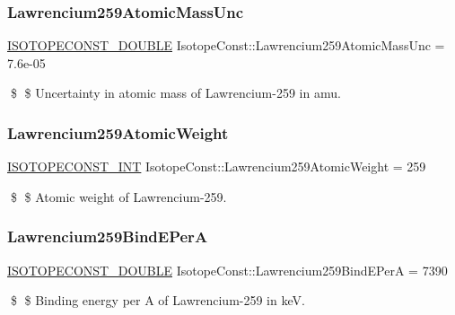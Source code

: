 \subsubsection{\texorpdfstring{Lawrencium259\+Atomic\+Mass\+Unc}{Lawrencium259AtomicMassUnc}}
{\footnotesize\ttfamily \mbox{\hyperlink{group___isotope_const-_macros_ga8f45a7272ce02c0b4c65c44636ed719a}{I\+S\+O\+T\+O\+P\+E\+C\+O\+N\+S\+T\+\_\+\+D\+O\+U\+B\+LE}} Isotope\+Const\+::\+Lawrencium259\+Atomic\+Mass\+Unc = 7.\+6e-\/05}

\$ \$ Uncertainty in atomic mass of Lawrencium-\/259 in amu. \mbox{\label{group___isotope_const-_lawrencium-_lr259_gaa89587a0f77e06d5c8cc6c7a11b0140a}} 
\subsubsection{\texorpdfstring{Lawrencium259\+Atomic\+Weight}{Lawrencium259AtomicWeight}}
{\footnotesize\ttfamily \mbox{\hyperlink{group___isotope_const-_macros_ga5f18360b3e99483a35c32d789e62621c}{I\+S\+O\+T\+O\+P\+E\+C\+O\+N\+S\+T\+\_\+\+I\+NT}} Isotope\+Const\+::\+Lawrencium259\+Atomic\+Weight = 259}

\$ \$ Atomic weight of Lawrencium-\/259. \mbox{\label{group___isotope_const-_lawrencium-_lr259_ga0d32745504d4ee950ba034310b5e9ea4}} 
\subsubsection{\texorpdfstring{Lawrencium259\+Bind\+E\+PerA}{Lawrencium259BindEPerA}}
{\footnotesize\ttfamily \mbox{\hyperlink{group___isotope_const-_macros_ga8f45a7272ce02c0b4c65c44636ed719a}{I\+S\+O\+T\+O\+P\+E\+C\+O\+N\+S\+T\+\_\+\+D\+O\+U\+B\+LE}} Isotope\+Const\+::\+Lawrencium259\+Bind\+E\+PerA = 7390}

\$ \$ Binding energy per A of Lawrencium-\/259 in keV. \mbox{\label{group___isotope_const-_lawrencium-_lr259_gacc6e8c29899e626e9b82f533e239e230}} 
